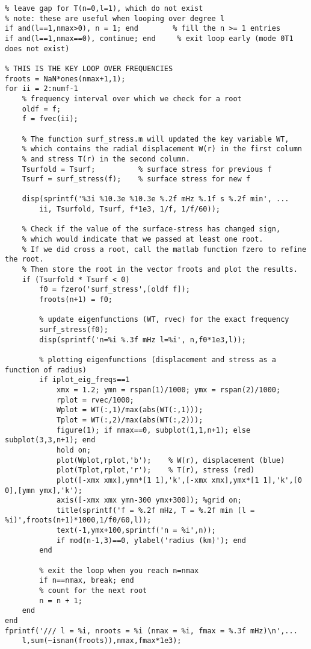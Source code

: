 \documentclass[11pt,titlepage,fleqn]{article}
\begin{document}
\begin{spacing}{1.0}
\begin{verbatim}
% leave gap for T(n=0,l=1), which do not exist
% note: these are useful when looping over degree l
if and(l==1,nmax>0), n = 1; end        % fill the n >= 1 entries
if and(l==1,nmax==0), continue; end     % exit loop early (mode 0T1 does not exist)

% THIS IS THE KEY LOOP OVER FREQUENCIES
froots = NaN*ones(nmax+1,1);
for ii = 2:numf-1
    % frequency interval over which we check for a root
    oldf = f;
    f = fvec(ii);
    
    % The function surf_stress.m will updated the key variable WT,
    % which contains the radial displacement W(r) in the first column
    % and stress T(r) in the second column.
    Tsurfold = Tsurf;          % surface stress for previous f
    Tsurf = surf_stress(f);    % surface stress for new f
    
    disp(sprintf('%3i %10.3e %10.3e %.2f mHz %.1f s %.2f min', ...
        ii, Tsurfold, Tsurf, f*1e3, 1/f, 1/f/60));

    % Check if the value of the surface-stress has changed sign,
    % which would indicate that we passed at least one root.
    % If we did cross a root, call the matlab function fzero to refine the root.
    % Then store the root in the vector froots and plot the results.
    if (Tsurfold * Tsurf < 0)
        f0 = fzero('surf_stress',[oldf f]);
        froots(n+1) = f0;

        % update eigenfunctions (WT, rvec) for the exact frequency
        surf_stress(f0);
        disp(sprintf('n=%i %.3f mHz l=%i', n,f0*1e3,l));

        % plotting eigenfunctions (displacement and stress as a function of radius)
        if iplot_eig_freqs==1
            xmx = 1.2; ymn = rspan(1)/1000; ymx = rspan(2)/1000;
            rplot = rvec/1000;
            Wplot = WT(:,1)/max(abs(WT(:,1)));
            Tplot = WT(:,2)/max(abs(WT(:,2)));
            figure(1); if nmax==0, subplot(1,1,n+1); else subplot(3,3,n+1); end
            hold on;
            plot(Wplot,rplot,'b');    % W(r), displacement (blue)
            plot(Tplot,rplot,'r');    % T(r), stress (red)
            plot([-xmx xmx],ymn*[1 1],'k',[-xmx xmx],ymx*[1 1],'k',[0 0],[ymn ymx],'k');
            axis([-xmx xmx ymn-300 ymx+300]); %grid on;
            title(sprintf('f = %.2f mHz, T = %.2f min (l = %i)',froots(n+1)*1000,1/f0/60,l));
            text(-1,ymx+100,sprintf('n = %i',n));
            if mod(n-1,3)==0, ylabel('radius (km)'); end
        end
        
        % exit the loop when you reach n=nmax
        if n==nmax, break; end
        % count for the next root
        n = n + 1;
    end
end
fprintf('/// l = %i, nroots = %i (nmax = %i, fmax = %.3f mHz)\n',...
    l,sum(~isnan(froots)),nmax,fmax*1e3);
\end{verbatim}
\normalsize


\end{spacing}
\end{document}
